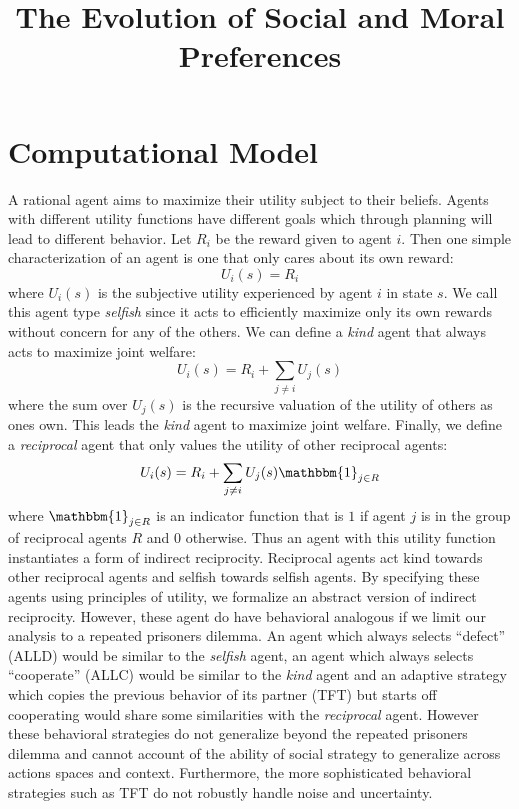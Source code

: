 \documentclass[doc, natbib]{apa6}
\title{The Evolution of Social and Moral Preferences}
\affiliation{}
\theoremstyle{definition}
\begin{document}
\maketitle

\section{Computational Model}

A rational agent aims to maximize their utility subject to their beliefs. Agents with different utility functions have different goals which through planning will lead to different behavior. Let $R_i$ be the reward given to agent $i$. Then one simple characterization of an agent is one that only cares about its own reward:
%
\begin{equation}
U_i(s) = R_i
\end{equation}
%
where $U_i(s)$ is the subjective utility experienced by agent $i$ in state $s$. We call this agent type \emph{selfish} since it acts to efficiently maximize only its own rewards without concern for any of the others. We can define a \emph{kind} agent that always acts to maximize joint welfare: 
%
\begin{equation}
U_i(s) = R_i + \sum_{j \neq i} U_j(s)
\end{equation}
%
where the sum over $U_j(s)$ is the recursive valuation of the utility of others as ones own. This leads the \emph{kind} agent to maximize joint welfare. Finally, we define a \emph{reciprocal} agent that only values the utility of other reciprocal agents:
%
\begin{equation}
U_i(s) = R_i + \sum_{j \neq i} U_j(s)\mathbbm{1}_{j \in R}
\end{equation}
%
where $\mathbbm{1}_{j \in R}$ is an indicator function that is $1$ if agent $j$ is in the group of reciprocal agents $R$ and $0$ otherwise. Thus an agent with this utility function instantiates a form of indirect reciprocity. Reciprocal agents act kind towards other reciprocal agents and selfish towards selfish agents. By specifying these agents using principles of utility, we formalize an abstract version of indirect reciprocity. However, these agent do have behavioral analogous if we limit our analysis to a repeated prisoners dilemma. An agent which always selects ``defect'' (ALLD) would be similar to the \emph{selfish} agent, an agent which always selects ``cooperate'' (ALLC) would be similar to the \emph{kind} agent and an adaptive strategy which copies the previous behavior of its partner (TFT) but starts off cooperating would share some similarities with the \emph{reciprocal} agent. However these behavioral strategies do not generalize beyond the repeated prisoners dilemma and cannot account of the ability of social strategy to generalize across actions spaces and context. Furthermore, the more sophisticated behavioral strategies such as TFT do not robustly handle noise and uncertainty. 
\end{document}
